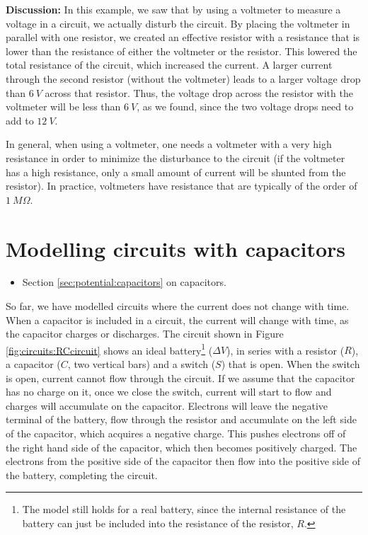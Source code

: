 \begin{example}
\textbf{Discussion: }In this example, we saw that by using a voltmeter to measure a voltage in a circuit, we actually disturb the circuit. By placing the voltmeter in parallel with one resistor, we created an effective resistor with a resistance that is lower than the resistance of either the voltmeter or the resistor. This lowered the total resistance of the circuit, which increased the current. A larger current through the second resistor (without the voltmeter) leads to a larger voltage drop than $\SI{6}{V}$ across that resistor. Thus, the voltage drop across the resistor with the voltmeter will be less than $\SI{6}{V}$, as we found, since the two voltage drops need to add to $\SI{12}{V}$.

In general, when using a voltmeter, one needs a voltmeter with a very high resistance in order to minimize the disturbance to the circuit (if the voltmeter has a high resistance, only a small amount of current will be shunted from the resistor). In practice, voltmeters have resistance that are typically of the order of $\SI{1}{M\Omega}$.
\end{example}

\section{Modelling circuits with capacitors}
\begin{review}
	\begin{itemize}
		\item Section \ref{sec:potential:capacitors} on capacitors.
	\end{itemize}
\end{review}
So far, we have modelled circuits where the current does not change with time. When a capacitor is included in a circuit, the current will change with time, as the capacitor charges or discharges. The circuit shown in Figure \ref{fig:circuits:RCcircuit} shows an ideal battery\footnote{The model still holds for a real battery, since the internal resistance of the battery can just be included into the resistance of the resistor, $R$.} ($\Delta V$), in series with a resistor ($R$), a capacitor ($C$, two vertical bars) and a switch ($S$) that is open. 
When the switch is open, current cannot flow through the circuit. If we assume that the capacitor has no charge on it, once we close the switch, current will start to flow and charges will accumulate on the capacitor. Electrons will leave the negative terminal of the battery, flow through the resistor and accumulate on the left side of the capacitor, which acquires a negative charge. This pushes electrons off of the right hand side of the capacitor, which then becomes positively charged. The electrons from the positive side of the capacitor then flow into the positive side of the battery, completing the circuit.

